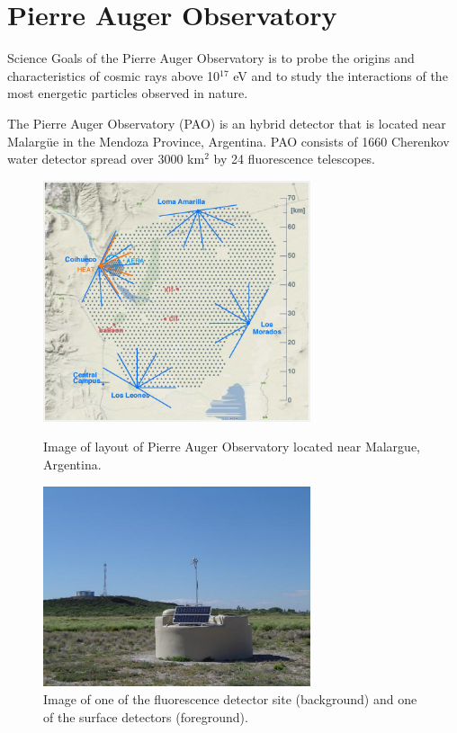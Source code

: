 \chapter[Pierre Auger Observatory]{\centering Pierre Auger Observatory \\}\label{Ch:PAO}


Science Goals of the Pierre Auger Observatory is to probe the origins and characteristics of cosmic rays above 10$^{17}$ eV and to study the interactions of the most energetic particles observed in nature.

The Pierre Auger Observatory (PAO) is an hybrid detector that is located near Malarg\"ue in the Mendoza Province, Argentina. PAO consists of 1660 Cherenkov water detector spread over 3000 km$^2$  by 24 fluorescence telescopes. 

\begin{figure}[hp]
\centering
\includegraphics[width=0.7\textwidth]{chapters/pix/PAO_equipment_layout_overview.png}
\caption{Image of layout of Pierre Auger Observatory located near Malargue, Argentina.}
\label{fig:PAO_layout}
\includegraphics[width=0.7\textwidth]{chapters/pix/pierre-auger-observatory_tankAndTelescope.jpg}
\caption{Image of one of the fluorescence detector site (background) and one of the surface detectors (foreground).}
\label{fig:PAO_TankAndTelescope}
\end{figure}


